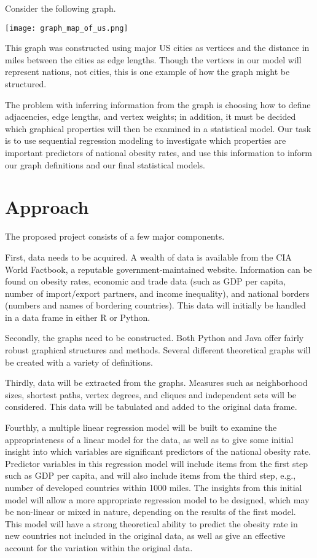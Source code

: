 \documentclass[12pt,letterpaper]{article}
\theoremstyle{definition}
\begin{document}
Consider the following graph.

\texttt{[image: graph\_map\_of\_us.png]}

This graph was constructed using major US cities as vertices and the distance in miles between the cities as edge lengths. Though the vertices in our model will represent nations, not cities, this is one example of how the graph might be structured.

The problem with inferring information from the graph is choosing how to define adjacencies, edge lengths, and vertex weights; in addition,
it must be decided which graphical properties will then be examined in a statistical model. Our task is to use sequential regression modeling to
investigate which properties are important predictors of national obesity rates, and use this information to inform our graph definitions and our final statistical models.

\section{Approach}
The proposed project consists of a few major components.

First, data needs to be acquired. A wealth of data is available from the CIA World Factbook, a reputable government-maintained website. Information can be
found on obesity rates, economic and trade data (such as GDP per capita, number of import/export partners, and income inequality), and national borders (numbers and names of bordering countries). This data will initially be handled in a data frame in either R or Python.

Secondly, the graphs need to be constructed. Both Python and Java offer fairly robust graphical structures and methods. Several different theoretical graphs will be created with a variety of definitions.

Thirdly, data will be extracted from the graphs. Measures such as neighborhood sizes, shortest paths, vertex degrees, and cliques and independent sets will be considered. This data will be tabulated and added to the original data frame.

Fourthly, a multiple linear regression model will be built to examine the appropriateness of a linear model for the data, as well as to give some initial insight into which variables are significant predictors of the national obesity rate. Predictor variables in this regression model will include items from the first step such as GDP per capita, and will also include items from the third step, e.g., number of developed countries within 1000 miles. The insights from this initial model will allow a more appropriate regression model to be designed, which may be non-linear or mixed in nature, depending on the results of the first model. This model will have a strong theoretical ability to predict the obesity rate in new countries not included in the original data, as well as give an effective account for the variation within the original data.
\end{document}
